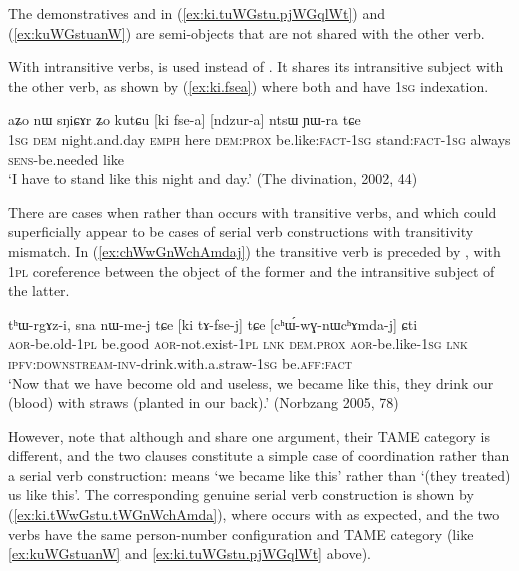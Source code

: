 The demonstratives  and  in (\ref{ex:ki.tuWGstu.pjWGqlWt}) and (\ref{ex:kuWGstuanW}) are semi-objects that are not shared with the other verb.

With intransitive verbs,  is used instead of . It shares its intransitive subject with the other verb, as shown by (\ref{ex:ki.fsea}) where both  and  have \textsc{1sg} indexation.

\begin{exe}
\ex \label{ex:ki.fsea}
\gll aʑo nɯ sŋiɕɤr ʑo kutɕu [ki fse-a] [ndzur-a] ntsɯ ɲɯ-ra tɕe \\
\textsc{1sg} \textsc{dem} night.and.day \textsc{emph} here \textsc{dem}:\textsc{prox} be.like:\textsc{fact}-\textsc{1sg} stand:\textsc{fact}-\textsc{1sg} always \textsc{sens}-be.needed like \\
\glt `I have to stand like this night and day.' (The divination, 2002, 44)
\end{exe}

There are cases when  rather than  occurs with transitive verbs, and which could superficially appear to be cases of serial verb constructions with transitivity mismatch.  In (\ref{ex:chWwGnWchAmdaj}) the transitive verb  is preceded by , with \textsc{1pl} coreference between the object of the former and the intransitive subject of the latter. 

\begin{exe}
\ex \label{ex:chWwGnWchAmdaj}
\gll tʰɯ-rgɤz-i, sna nɯ-me-j tɕe [ki tɤ-fse-j] tɕe [cʰɯ́-wɣ-nɯcʰɤmda-j] ɕti  \\
\textsc{aor}-be.old-\textsc{1pl} be.good \textsc{aor}-not.exist-\textsc{1pl} \textsc{lnk} \textsc{dem}.\textsc{prox} \textsc{aor}-be.like-\textsc{1sg} \textsc{lnk} \textsc{ipfv}:\textsc{downstream}-\textsc{inv}-drink.with.a.straw-\textsc{1sg} be.\textsc{aff}:\textsc{fact} \\
\glt `Now that we have become old and useless, we became like this, they drink our (blood) with straws (planted in our back).' (Norbzang 2005, 78)
\end{exe}

However, note that although  and  share one argument, their TAME category is different, and the two clauses constitute a simple case of coordination rather than a serial verb construction:  means `we became like this' rather than `(they treated) us like this'. The corresponding genuine serial verb construction is shown by (\ref{ex:ki.tWwGstu.tWGnWchAmda}), where  occurs with  as expected, and the two verbs have the same person-number configuration and TAME category (like \ref{ex:kuWGstuanW} and \ref{ex:ki.tuWGstu.pjWGqlWt} above).

